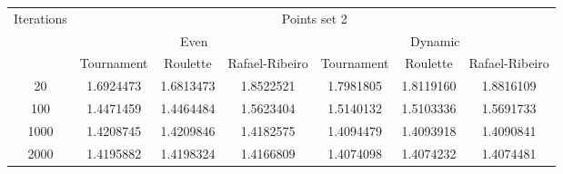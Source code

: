 \begin{center}
	\begin{tabular}{|c|c|c|c|c|c|c|}
		\hline
		\multirow{3}{*}{Iterations}	&	\multicolumn{6}{c|}{Points set 2}	\\
										\cline{2-7}
									&	\multicolumn{3}{c|}{Even}	& \multicolumn{3}{c|}{Dynamic} \\
										\cline{2-7}
									&	Tournament		&	Roulette		&	Rafael-Ribeiro	&	Tournament		&	Roulette		&	Rafael-Ribeiro		\\
		\hline
		20							&	1.6924473		&	1.6813473		&	1.8522521		&	1.7981805		&	1.8119160		&	1.8816109			\\
		\hline
		100							&	1.4471459		&	1.4464484		&	1.5623404		&	1.5140132		&	1.5103336		&	1.5691733			\\
		\hline
		1000						&	1.4208745		&	1.4209846		&	1.4182575		&	1.4094479		&	1.4093918		&	1.4090841			\\
		\hline	
		2000						&	1.4195882		&	1.4198324		&	1.4166809		&	1.4074098		&	1.4074232		&	1.4074481			\\
		\hline
	\end{tabular}
	\label{tab:selection_type_2}
\end{center}
